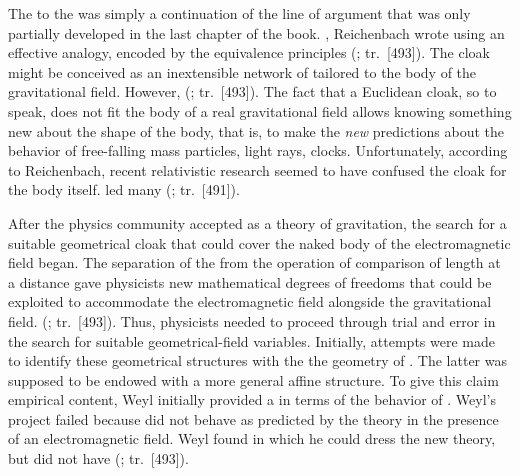 \documentclass[final]{article}
\newcommand{\PRZL}{\citetitle{Reichenbach1928}\xspace}
\renewcommand{\rzlap}[2]{(\cite[#1]{Reichenbach1928}; tr.\ [#2])\xspace}
\begin{document}
The \Ap to the \PRZL was simply a continuation of the line of argument that was only partially developed in the last chapter of the book. , Reichenbach wrote using an effective analogy,  encoded by the equivalence principles  \rzlap{354}{493}. The cloak might be conceived as an inextensible network of \rac tailored to the body of the gravitational field. However,  \rzlap{354}{493}. The fact that a Euclidean cloak, so to speak, does not fit the body of a real gravitational field allows knowing something new about the shape of the body, that is, to make the \emph{new} predictions about the behavior of free-falling mass particles, light rays, clocks\etc. Unfortunately, according to Reichenbach, recent relativistic research seemed to have confused the cloak for the body itself.  led many  \rzlap{352}{491}. 

After the physics community accepted \gr as a theory of gravitation, the search for a suitable geometrical cloak that could cover the naked body of the electromagnetic field began. The separation of the  \Gtmn from the operation of comparison of length at a distance \gmn gave physicists new mathematical degrees of freedoms that could be exploited to accommodate the electromagnetic field alongside the gravitational field.  \rzlap{354}{493}. Thus, physicists needed to proceed through trial and error in the search for suitable geometrical-field variables. Initially, attempts were made to identify these geometrical structures with the  the geometry of \spti. The latter was supposed to be endowed with a more general affine structure. To give this claim empirical content, Weyl initially provided a  \Gtmn in terms of the behavior of \rac. Weyl's project failed because \rac did not behave as predicted by the theory in the presence of an electromagnetic field. Weyl found  in which he could dress the new theory, but did not have  \rzlap{353}{493}.
\end{document}
